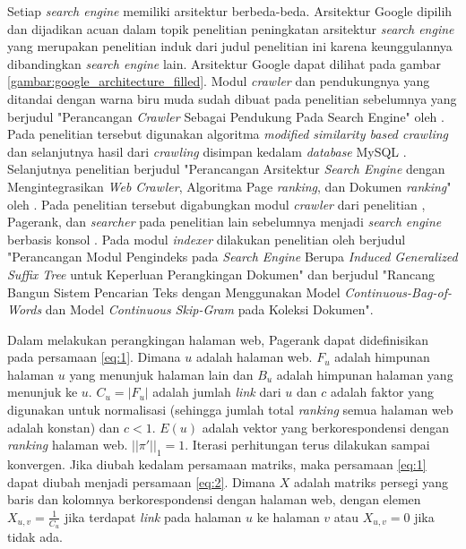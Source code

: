\documentclass[
	a4paper, %
	12pt, %
	unnumberedsections, %
	twoside, %
]{LTJournalArticle}
\begin{document}
Setiap \textit{search engine} memiliki arsitektur berbeda-beda. Arsitektur Google dipilih dan dijadikan acuan dalam topik penelitian peningkatan arsitektur \textit{search engine} yang merupakan penelitian induk dari judul penelitian ini karena keunggulannya dibandingkan \textit{search engine} lain. Arsitektur Google dapat dilihat pada gambar \ref{gambar:google_architecture_filled}. Modul \textit{crawler} dan pendukungnya yang ditandai dengan warna biru muda sudah dibuat pada penelitian sebelumnya yang berjudul "Perancangan \textit{Crawler} Sebagai Pendukung Pada Search Engine" oleh \citet{qoriiba2021perancangan}. Pada penelitian tersebut digunakan algoritma \textit{modified similarity based crawling} dan selanjutnya hasil dari \textit{crawling} disimpan kedalam \textit{database} MySQL \citep{qoriiba2021perancangan}. Selanjutnya penelitian berjudul "Perancangan Arsitektur \textit{Search Engine} dengan Mengintegrasikan \textit{Web Crawler}, Algoritma Page \textit{ranking}, dan Dokumen \textit{ranking}" oleh \citet{khatulistiwa2022SearchEngine}. Pada penelitian tersebut digabungkan modul \textit{crawler} dari penelitian \citet{qoriiba2021perancangan}, Pagerank, dan \textit{searcher} pada penelitian lain sebelumnya menjadi \textit{search engine} berbasis konsol \citep{khatulistiwa2022SearchEngine}. Pada modul \textit{indexer} dilakukan penelitian oleh \citet{pratama2022indexer} berjudul "Perancangan Modul Pengindeks pada \textit{Search Engine} Berupa \textit{Induced Generalized Suffix Tree} untuk Keperluan Perangkingan Dokumen" dan \citet{zalghornain2022indexer} berjudul "Rancang Bangun Sistem Pencarian Teks dengan Menggunakan Model \textit{Continuous-Bag-of-Words} dan Model \textit{Continuous Skip-Gram} pada Koleksi Dokumen".

Dalam melakukan perangkingan halaman web, Pagerank dapat didefinisikan pada persamaan \ref{eq:1}. Dimana $u$ adalah halaman web. $F_u$ adalah himpunan halaman $u$ yang menunjuk halaman lain dan $B_u$ adalah himpunan halaman yang menunjuk ke $u$. $C_u = |F_u|$ adalah jumlah \textit{link} dari $u$ dan $c$ adalah faktor yang digunakan untuk normalisasi (sehingga jumlah total \textit{ranking} semua halaman web adalah konstan) dan $c < 1$. $E(u)$ adalah vektor yang berkorespondensi dengan \textit{ranking} halaman web. $||\pi'||_1 = 1$. Iterasi perhitungan terus dilakukan sampai konvergen. Jika diubah kedalam persamaan matriks, maka persamaan \ref{eq:1} dapat diubah menjadi persamaan \ref{eq:2}. Dimana $X$ adalah matriks persegi yang baris dan kolomnya berkorespondensi dengan halaman web, dengan elemen $X_{u,v} = \frac{1}{C_u}$ jika terdapat \textit{link} pada halaman $u$ ke halaman $v$ atau $X_{u,v} = 0$ jika tidak ada.
\end{document}
